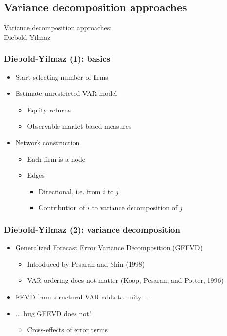\documentclass[aspectratio=43,dvipsnames,usenames, svgnames]{beamer}
\begin{document}
\subsection{Variance decomposition approaches}

\begin{frame} %
\begin{center}
	\Large{Variance decomposition approaches:\\
	Diebold-Yilmaz}
\end{center}
\end{frame}

\begin{frame} %
  \frametitle{Diebold-Yilmaz (1): basics}
  \begin{itemize}
     \item Start selecting number of firms
     \smallskip
  	 \item Estimate unrestricted VAR model
  	 \begin{itemize}
  	 	\item Equity returns
  	 	\item Observable market-based measures
  	 \end{itemize}  	
  	 \smallskip
  	 \item Network construction
  	 \begin{itemize}
  	 	\item Each firm is a node
  	 	\item Edges
  	 	\begin{itemize}
  	 		\item Directional, i.e. from $i$ to $j$
  	 		\item Contribution of $i$ to variance decomposition of $j$
  	 	\end{itemize}
  	 \end{itemize}
  \end{itemize}
\end{frame}

\begin{frame} %
  \frametitle{Diebold-Yilmaz (2): variance decomposition}
  \begin{itemize}
    \item Generalized Forecast Error Variance Decomposition (GFEVD)
    \begin{itemize}
      \item Introduced by Pesaran and Shin (1998)
      \item VAR ordering does not matter (Koop, Pesaran, and Potter, 1996)
    \end{itemize}
    \smallskip
    \item FEVD from structural VAR adds to unity ...
    \smallskip
    \item ... bug GFEVD does not!
    \begin{itemize}
    	\item Cross-effects of error terms
    \end{itemize}
  \end{itemize}
\end{frame}
\end{document}
